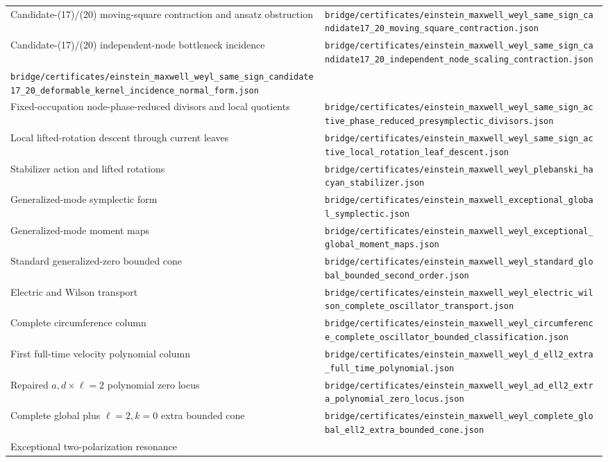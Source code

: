 \documentclass[11pt]{article}
\theoremstyle{definition}
\theoremstyle{remark}
\newcommand{\cert}[1]{\nolinkurl{#1}}
\begin{document}
\begin{longtable}{@{}>{\raggedright\arraybackslash}p{} >{\raggedright\arraybackslash}p{}@{}}
Candidate-(17)/(20) moving-square contraction and ansatz obstruction &
\cert{bridge/certificates/einstein_maxwell_weyl_same_sign_candidate17_20_moving_square_contraction.json}\\
Candidate-(17)/(20) independent-node bottleneck incidence &
\cert{bridge/certificates/einstein_maxwell_weyl_same_sign_candidate17_20_independent_node_scaling_contraction.json}\\
\cert{bridge/certificates/einstein_maxwell_weyl_same_sign_candidate17_20_deformable_kernel_incidence_normal_form.json}\\
Fixed-occupation node-phase-reduced divisors and local quotients &
\cert{bridge/certificates/einstein_maxwell_weyl_same_sign_active_phase_reduced_presymplectic_divisors.json}\\
Local lifted-rotation descent through current leaves &
\cert{bridge/certificates/einstein_maxwell_weyl_same_sign_active_local_rotation_leaf_descent.json}\\
Stabilizer action and lifted rotations &
\cert{bridge/certificates/einstein_maxwell_weyl_plebanski_hacyan_stabilizer.json}\\
Generalized-mode symplectic form &
\cert{bridge/certificates/einstein_maxwell_exceptional_global_symplectic.json}\\
Generalized-mode moment maps &
\cert{bridge/certificates/einstein_maxwell_weyl_exceptional_global_moment_maps.json}\\
Standard generalized-zero bounded cone &
\cert{bridge/certificates/einstein_maxwell_weyl_standard_global_bounded_second_order.json}\\
Electric and Wilson transport &
\cert{bridge/certificates/einstein_maxwell_weyl_electric_wilson_complete_oscillator_transport.json}\\
Complete circumference column &
\cert{bridge/certificates/einstein_maxwell_weyl_circumference_complete_oscillator_bounded_classification.json}\\
First full-time velocity polynomial column &
\cert{bridge/certificates/einstein_maxwell_weyl_d_ell2_extra_full_time_polynomial.json}\\
Repaired $a,d\times\ell=2$ polynomial zero locus &
\cert{bridge/certificates/einstein_maxwell_weyl_ad_ell2_extra_polynomial_zero_locus.json}\\
Complete global plus $\ell=2,k=0$ extra bounded cone &
\cert{bridge/certificates/einstein_maxwell_weyl_complete_global_ell2_extra_bounded_cone.json}\\
Exceptional two-polarization resonance &

\end{longtable}
\end{document}
